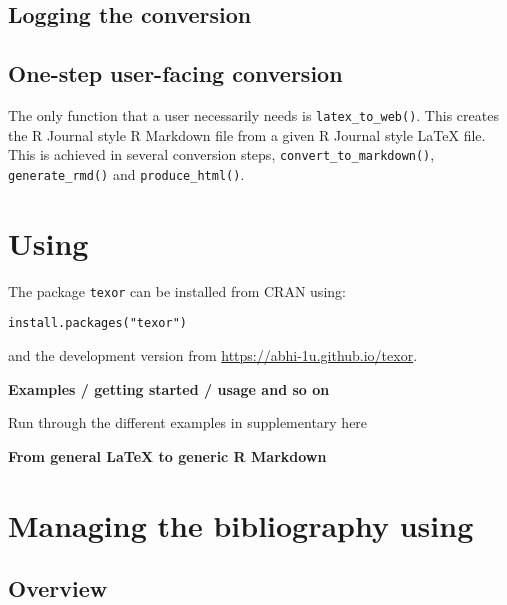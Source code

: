 \hypertarget{logging-the-conversion}{%
\subsection{Logging the conversion}\label{logging-the-conversion}}

\hypertarget{one-step-user-facing-conversion}{%
\subsection{One-step user-facing conversion}\label{one-step-user-facing-conversion}}

The only function that a user necessarily needs is \texttt{latex\_to\_web()}. This creates the R Journal style R Markdown file from a given R Journal style LaTeX file.
This is achieved in several conversion steps, \texttt{convert\_to\_markdown()}, \texttt{generate\_rmd()} and \texttt{produce\_html()}.

\hypertarget{using}{%
\section{\texorpdfstring{Using }{Using }}\label{using}}

The package \texttt{texor} can be installed from CRAN using:

\begin{verbatim}
install.packages("texor")
\end{verbatim}

and the development version from \url{https://abhi-1u.github.io/texor}.

\textbf{Examples / getting started / usage and so on}

Run through the different examples in supplementary here

\textbf{From general LaTeX to generic R Markdown}

\hypertarget{managing-the-bibliography-using}{%
\section{\texorpdfstring{Managing the bibliography using }{Managing the bibliography using }}\label{managing-the-bibliography-using}}

\hypertarget{overview}{%
\subsection{Overview}\label{overview}}

